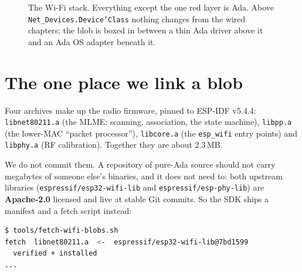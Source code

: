 \begin{figure}[ht]
\centering
{}
\caption{The Wi-Fi stack. Everything except the one red layer is Ada. Above
\texttt{Net\_Devices.Device'Class} nothing changes from the wired chapters; the
blob is boxed in between a thin Ada driver above it and an Ada OS adapter beneath
it.}
\label{fig:wifi-layers}
\end{figure}

\section{The one place we link a blob}
\label{ch:wifi:blobs}

Four archives make up the radio firmware, pinned to ESP-IDF v5.4.4:
\texttt{libnet80211.a} (the MLME: scanning, association, the state machine),
\texttt{libpp.a} (the lower-MAC ``packet processor''), \texttt{libcore.a} (the
\texttt{esp\_wifi} entry points) and \texttt{libphy.a} (RF calibration). Together
they are about 2.3\,MB.

We do not commit them. A repository of pure-Ada source should not carry megabytes
of someone else's binaries, and it does not need to: both upstream libraries
(\texttt{espressif/esp32-wifi-lib} and \texttt{espressif/esp-phy-lib}) are
\textbf{Apache-2.0} licensed and live at stable Git commits. So the SDK ships a
manifest and a fetch script instead:

\begin{lstlisting}[language=bash]
$ tools/fetch-wifi-blobs.sh
fetch  libnet80211.a  <-  espressif/esp32-wifi-lib@7bd1599
  verified + installed
...
\end{lstlisting}

